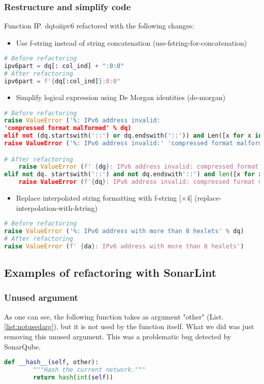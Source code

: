 \documentclass[unicode,11pt,a4paper,oneside,numbers=endperiod,openany]{scrartcl}
\begin{document}
\subsubsection{Restructure and simplify code}
Function IP. \textunderscore dqtoi\textunderscore ipv6 refactored with the following changes:
\begin{itemize}
    \item Use f-string instead of string concatenation (use-fstring-for-concatenation)
\end{itemize}
\begin{lstlisting}[language=Python]
# Before refactoring
ipv6part = dq[: col_ind] + ":0:0"
# After refactoring
ipv6part = f'{dq[:col_ind]}:0:0"
\end{lstlisting}
\begin{itemize}
    \item Simplify logical expression using De Morgan identities (de-morgan)
\end{itemize}
\begin{lstlisting}[language=Python]
# Before refactoring
raise ValueError ('%: IPv6 address invalid:
'compressed format malformed' % dq)
elif not (dq.startswith('::') or dq.endswith('::')) and Len([x for x in hx if x == "']) > 1:
raise ValueError ('%: IPv6 address invalid:' 'compressed format malformed' % da)

# After refactoring
    raise ValueError (f' {dg}: IPv6 address invalid: compressed format malformed')
elif not dq. startswith('::') and not dq.endswith'::') and len([x for x in hx if x == 1']) > 1:
    raise ValueError (f'{dq}: IPv6 address invalid: compressed format malformed'")
\end{lstlisting}
\begin{itemize}
    \item Replace interpolated string formatting with f-string [×4] (replace-interpolation-with-fstring)
\end{itemize}
\begin{lstlisting}[language=Python]
# Before refactoring
raise ValueError ('%: IPv6 address with more than 8 hexlets' % dq)
# After refactoring
raise ValueError (f' {da}: IPv6 address with more than 8 hexlets')
\end{lstlisting}
\subsection{Examples of refactoring with SonarLint}
\subsubsection{Unused argument}
As one can see, the following function takes as argument "other" (List. \ref{list:notusedarg}), but it is not used by the function itself. What we did was just removing this unused argument. This was a problematic bug detected by SonarQube. 
\begin{lstlisting}[language=Python,label=list:notusedarg, caption=Unused argument  ]
def __hash__(self, other):
        """Hash the current network."""
        return hash(int(self))
        
\end{lstlisting}
\end{document}

